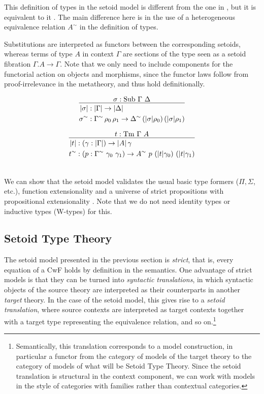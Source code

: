 \documentclass[autoref]{llncs}
\newcommand{\GG}{\Gamma}
\newcommand{\GD}{\Delta}
\newcommand{\Tm}{\mathrm{Tm}}
\newcommand{\Sub}{\mathrm{Sub}}
\begin{document}
This definition of types in the setoid model is different from the one in
\cite{setoid99}, but it is equivalent to it \cite[Section 1.6.1]{simonthesis}. The main
difference here is in the use of a heterogeneous equivalence relation $A^\sim$
in the definition of types.

Substitutions are interpreted as functors between the corresponding setoids,
whereas terms of type $A$ in context $\GG$ are sections of the type seen as a
setoid fibration $\GG . A \to \GG$. Note that we only need to include components
for the functorial action on objects and morphisms, since the functor laws
follow from proof-irrelevance in the metatheory, and thus hold definitionally.
\\
\begin{minipage}{0.5\textwidth}
\[
\infer{
  \begin{aligned}
    | \sigma | &: | \GG | \to | \GD | \\
    \sigma^\sim &: \GG^\sim\, \rho_0\, \rho_1 \to \GD^\sim\, (|\sigma|\rho_0)\, (|\sigma|\rho_1)
  \end{aligned}
}{
  \sigma : \Sub\ \GG\ \GD
}
\]
\end{minipage}
\begin{minipage}{0.5\textwidth}
\[
\infer{
  \begin{aligned}
    | t | &: (\gamma : | \GG |) \to | A | \, \gamma \\
    t^\sim &: (p : \GG^\sim\ \gamma_0\ \gamma_1) \to A^\sim\ p\ (|t|\gamma_0)\ (|t|\gamma_1)
  \end{aligned}
}{
  t : \Tm\ \GG\ A
}
\]
\end{minipage}
\\

We can show that the setoid model validates the usual basic type formers ($\Pi,
\Sigma$, etc.), function extensionality and a universe of strict
propositions with propositional extensionality \cite{setoid99}. Note that
we do not need identity types or inductive types (W-types) for this.

\subsection{Setoid Type Theory}\label{sett}

The setoid model presented in the previous section is \emph{strict}, that is,
every equation of a CwF holds by definition in the semantics. One advantage of
strict models is that they can be turned into \emph{syntactic translations}, in
which syntactic objects of the source theory are interpreted as their
counterparts in another \emph{target} theory. In the case of the setoid model,
this gives rise to a \emph{setoid translation}, where source contexts are
interpreted as target contexts together with a target type representing the
equivalence relation, and so on.\footnote{%
Semantically, this translation corresponds to a model construction, in
particular a functor from the category of models of the target theory to the
category of models of what will be Setoid Type Theory.  Since the setoid
translation is structural in the context component, we can work with models in
the style of categories with families rather than contextual categories.
}
\end{document}
